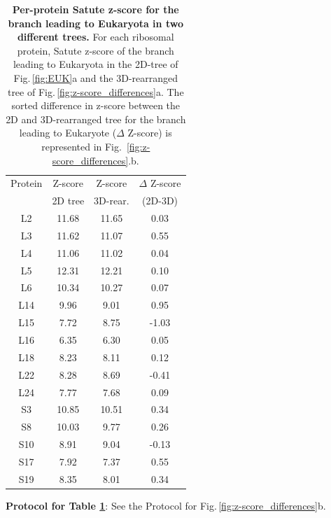 \begin{table}[h!]
    \centering
    \begin{tabular}{|c|c|c|c|}
\hline
Protein& Z-score & Z-score& $\Delta$ Z-score\\
&2D tree & 3D-rear. & (2D-3D)\\
\hline
L2&11.68&11.65& 0.03\\
L3&11.62&11.07& 0.55\\
L4&11.06&11.02& 0.04\\
L5&12.31&12.21& 0.10\\
L6&10.34&10.27& 0.07\\
L14&9.96&9.01& 0.95\\
L15&7.72&8.75& -1.03\\
L16&6.35&6.30& 0.05\\
L18&8.23&8.11& 0.12\\
L22&8.28&8.69& -0.41\\
L24&7.77&7.68& 0.09\\
S3&10.85&10.51& 0.34\\
S8&10.03&9.77& 0.26\\
S10&8.91&9.04& -0.13\\
S17&7.92&7.37& 0.55\\
S19&8.35&8.01& 0.34\\
\hline
    \end{tabular}
    \vspace{0.25cm}
    \caption{\textbf{Per-protein Satute z-score for the branch leading to Eukaryota in two different trees.} For each ribosomal protein, Satute z-score of the branch leading to Eukaryota in the 2D-tree of Fig.\,\ref{fig:EUK}a and the 3D-rearranged tree of Fig.\,\ref{fig:z-score_differences}a. The sorted difference in z-score between the 2D and 3D-rearranged tree for the branch leading to Eukaryote ($\Delta$ Z-score) is represented in Fig.\, \ref{fig:z-score_differences}.b.}
    \label{tab:protein_2D_3D}
    \end{table}

\noindent  \textbf{Protocol for  Table \ref{tab:protein_2D_3D}}: See the Protocol for Fig.\,\ref{fig:z-score_differences}b.
\newpage 

